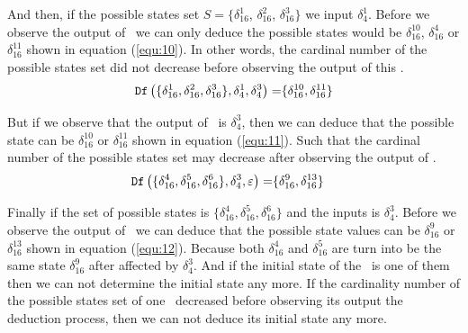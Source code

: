 And then, if the possible states set $S=\{\delta_{16}^1$, $\delta_{16}^2$, $\delta_{16}^3\}$ we input $\delta_4^1$. Before we observe the output of \BCN\ we can only deduce the possible states would be $\delta_{16}^{10}$, $\delta_{16}^4$ or  $\delta_{16}^{11}$ shown in equation (\ref{equ:10}). In other words, the cardinal number of the possible states set did not decrease before observing the output of this \BCN.
\begin{equation}
\begin{split}
{\tt Df}\left(\{\delta_{16}^1,\delta_{16}^2,\delta_{16}^3\},\delta_4^1,\delta_4^3\right)=&\{\delta_{16}^{10},\delta_{16}^{11}\}\\
\end{split}
\label{equ:11}
\end{equation}

But if we observe that the output of \BCN\ is $\delta_4^3$, then we can deduce that the possible state can be $\delta_{16}^{10}$ or  $\delta_{16}^{11}$ shown in equation (\ref{equ:11}). Such that the cardinal number of the possible states set may decrease after observing the output of \BCN.
\begin{equation}
\begin{split}
{\tt Df}\left(\{\delta_{16}^4,\delta_{16}^5,\delta_{16}^6\},\delta_4^3,\varepsilon\right)=&\{\delta_{16}^9,\delta_{16}^{13}\}
\end{split}
\label{equ:12}
\end{equation}

 Finally if the set of possible states is $\{\delta_{16}^4,\delta_{16}^5,\delta_{16}^6\}$ and the inputs is $\delta_4^3$. Before we observe the output of \BCN\ we can deduce that the possible state values can be $\delta_{16}^9$ or $\delta_{16}^{13}$ shown in equation (\ref{equ:12}). Because both $\delta_{16}^4$ and $\delta_{16}^5$ are turn into be the same state $\delta_{16}^9$ after affected by $\delta_4^3$. And if the initial state of the \BCN\ is one of them then we can not determine the initial state any more. If the cardinality number of the possible states set of one \BCN\ decreased before observing its output the deduction process, then we can not deduce its initial state any more. 

